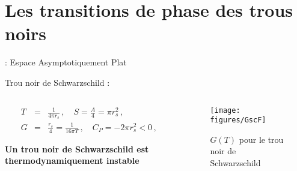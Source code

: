\section{Les transitions de phase des trous noirs}

\begin{frame}{\underline{\secname} : Espace Asymptotiquement Plat}
\begin{block}{Trou noir de Schwarzschild :}
	
	\begin{columns}
		\begin{column}{0.5\linewidth}
		
	\begin{eqnarray*}
	T&=&\frac{1}{4\pi r_s}\,,\quad
	S=\frac{A}{4}=\pi r_s^2\,,\nonumber\\ G&=&\frac{r_s}{4}=\frac{1}{16\pi T}\,,\quad
	C_P=-2 \pi r_s^2<0\,,
	\end{eqnarray*}	
	\pause		
	
\begin{center}
	\textbf{Un trou noir de Schwarzschild est thermodynamiquement instable 	}
\end{center}

		\end{column}
		\begin{column}{0.5\linewidth}
			\begin{figure}[H]
				\begin{center}
					
					\texttt{[image: figures/GscF]}
					
					\caption{$G(T)$ pour le trou noir de Schwarzschild}
				\end{center}
			\end{figure}
			
			
		\end{column}
	\end{columns}
\end{block}
\end{frame}


